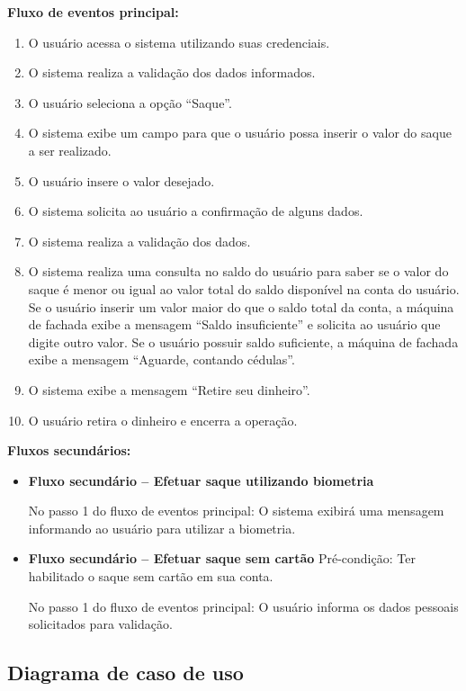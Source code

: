 \textbf{Fluxo de eventos principal:}

\begin{enumerate}
  \item O usuário acessa o sistema utilizando suas credenciais.
  \item O sistema realiza a validação dos dados informados.
  \item O usuário seleciona a opção ``Saque''.
  \item O sistema exibe um campo para que o usuário possa inserir o valor do saque a ser realizado.
  \item O usuário insere o valor desejado.
  \item O sistema solicita ao usuário a confirmação de alguns dados.
  \item O sistema realiza a validação dos dados.
  \item O sistema realiza uma consulta no saldo do usuário para saber se o valor do saque é menor ou igual ao valor total do saldo disponível na conta do usuário.
    \subitem Se o usuário inserir um valor maior do que o saldo total da conta, a máquina de fachada exibe a mensagem ``Saldo insuficiente'' e solicita ao usuário que digite outro valor.
    \subitem Se o usuário possuir saldo suficiente, a máquina de fachada exibe a mensagem ``Aguarde, contando cédulas''.
  \item O sistema exibe a mensagem ``Retire seu dinheiro''.
  \item O usuário retira o dinheiro e encerra a operação.
\end{enumerate}

\textbf{Fluxos secundários:}

\begin{itemize}
  \item \textbf{Fluxo secundário – Efetuar saque utilizando biometria}

  No passo 1 do fluxo de eventos principal:
  \subitem O sistema exibirá uma mensagem informando ao usuário para utilizar a biometria.

  \item \textbf{Fluxo secundário – Efetuar saque sem cartão}
  Pré-condição: Ter habilitado o saque sem cartão em sua conta.

  No passo 1 do fluxo de eventos principal:
  \subitem O usuário informa os dados pessoais solicitados para validação.

\end{itemize}

\subsection{Diagrama de caso de uso}

